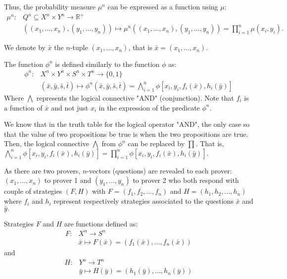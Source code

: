 Thus, the probability measure $\mu^n$ can be expressed as a function using $\mu$: 
 \begin{align*}
\mu^n:  & Q^n \subseteq X^n \times Y^n  \longrightarrow \mathbb{R}^+ \\
  & ((x_1,\ldots, x_n), (y_1,\ldots, y_n)) \longmapsto \mu^n((x_1,\ldots, x_n), (y_1,\ldots, y_n))=\prod_{i=1}^n  \mu (x_i, y_i). 
 \end{align*}
 
We denote by  $\bar{x}$ the $n$-tuple $(x_1,\ldots, x_n)$, that is $\bar{x}=(x_1,\ldots, x_n)$. 

The function $\phi^n$ is defined similarly to the function $ \phi$ as:
\begin{align*}
\phi^n: & X^n \times Y^n \times S^n \times T^n  \longrightarrow  \{0,1\}\\ 
& (\bar{x}, \bar{y},\bar{s}, \bar{t})  \longmapsto  \phi^n(\bar{x}, \bar{y},\bar{s}, \bar{t}) = \bigwedge\limits_{i=1}^n \phi [x_i,y_i, f_i(\bar{x}), h_i(\bar{y})]
\end{align*}
Where $\bigwedge$ represents the logical connective "AND" (conjunction).
Note that $f_i$ is a function of $\bar{x}$ and not just $x_i$  in the expression of the predicate $\phi^n$.

We know that in the truth table for the logical operator "AND", the only case so that the value of two propositions be true is when the two propositions are true. Then, the logical connective $\bigwedge$ from $\phi^n$ can be replaced by $\prod.$ That is,  $\bigwedge\limits_{i=1}^n \phi [x_i,y_i, f_i(\bar{x}), h_i(\bar{y})]=\prod\limits_{i=1}^n  \phi [x_i,y_i, f_i(\bar{x}), h_i(\bar{y})].$

As there are two provers, $n$-vectors (questions) are revealed to each prover:  $(x_1, \ldots , x_n)$ to prover 1 and  $(y_1, \ldots , y_n)$ to prover 2 who both respond with  couple of strategies $(F,H)$ with $F=(f_1, f_2, \ldots, f_n)$ and $H=(h_1, h_2, \ldots, h_n)$ where $f_i$ and $h_i$ represent respectively strategies associated to the questions $\bar{x}$ and $\bar{y}.$

Strategies $F$ and $H$ are functions defined as:
 \begin{align*}
 F: & X^n \longrightarrow S^n\\
 &  \bar{x} \longmapsto F(\bar{x})=(f_1(\bar{x}), \ldots , f_n(\bar{x})) \end{align*}  and 
 \begin{align*} 
 H: & Y^n \longrightarrow T^n\\
 & \bar{y} \longmapsto H(\bar{y})=(h_1(\bar{y}), \ldots , h_n(\bar{y}))
 \end{align*}

